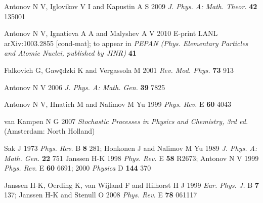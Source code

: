 \documentclass[12pt]{article}
\begin{document}
\begin{thebibliography}{99}
 Antonov N V, Iglovikov V I and Kapustin A S 2009
{\it J. Phys. A: Math. Theor.} {\bf 42} 135001

 Antonov N V, Ignatieva A A and Malyshev A V 2010
E-print LANL arXiv:1003.2855 [cond-mat]; to appear in {\it PEPAN
(Phys. Elementary Particles and Atomic Nuclei, published by JINR)} {\bf 41}

 Falkovich G, Gaw\c{e}dzki K and Vergassola M  2001
{\it Rev. Mod. Phys.} {\bf 73} 913

 Antonov N V 2006 {\it J. Phys. A: Math. Gen.} {\bf 39} 7825

 Antonov N V, Hnatich M and Nalimov M Yu 1999
{\it Phys. Rev.} E {\bf 60} 4043

 van Kampen N G 2007 {\it Stochastic Processes in Physics
and Chemistry, 3rd ed.} (Amsterdam: North Holland)

 Sak J 1973 {\it Phys. Rev.} B {\bf 8} 281;
Honkonen J and Nalimov M Yu 1989 {\it J. Phys. A: Math. Gen.} {\bf 22} 751
Janssen H-K 1998 {\it Phys. Rev.} E {\bf 58} R2673;
Antonov N V 1999 {\it Phys. Rev.} E {\bf 60} 6691;
2000 {\it Physica} D {\bf 144} 370

 Janssen H-K, Oerding K, van Wijland F and Hilhorst H J
1999 {\it Eur. Phys. J.} B {\bf 7} 137; Janssen H-K and Stenull O 2008
{\it Phys. Rev.} E {\bf 78} 061117

\end{thebibliography}
\end{document}
